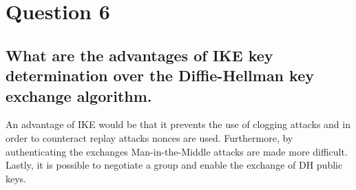 \documentclass{report}
\begin{document}
	\section{Question 6}
	\startsection
		\renewcommand{\thesubsection}{\thesection.\Alph{subsection}}
		\subsection{What are the advantages of IKE key determination over the Diffie-Hellman key exchange algorithm.}
		\startsubsection
			An advantage of IKE would be that it prevents the use of clogging attacks and in order to counteract replay attacks nonces are used. Furthermore, by authenticating the exchanges Man-in-the-Middle attacks are made more difficult. Lastly, it is possible to negotiate a group and enable the exchange of DH public keys.
		\closesection
	\closesection
\end{document}
